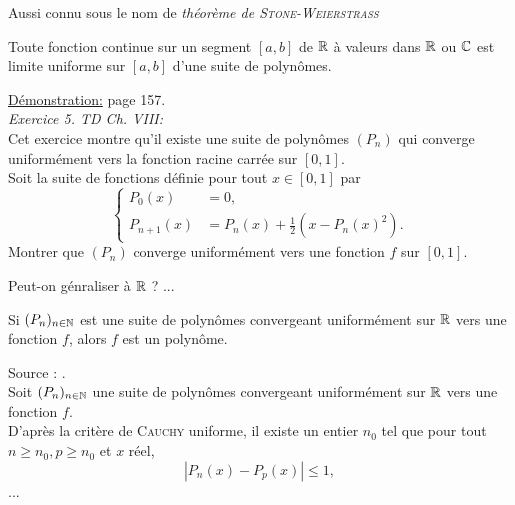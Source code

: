 Aussi connu sous le nom  de \emph{théorème de \textsc{Stone-Weierstrass}}

\begin{tcolorbox}
    Toute fonction continue sur un segment $[a, b]$ de $\mathbb{R}$ à valeurs dans $\mathbb{R}$ ou $\mathbb{C}$ est limite uniforme sur $[a, b]$ d'une suite de polynômes.
\end{tcolorbox}

\underline{Démonstration:} \cite{calcul_infinitesimal} page 157. \\
\emph{Exercice 5. TD Ch. VIII:}\\
Cet exercice montre qu'il existe une suite de polynômes $(P_n)$ qui converge uniformément vers la fonction racine carrée sur $[0, 1]$.\\
Soit la suite de fonctions définie pour tout $x \in [0, 1]$ par
$$
\begin{cases}
    P_0(x) &= 0,\\
    P_{n+1}(x) &= P_n (x) + \frac{1}{2}\left(x-P_n (x)^2 \right).
\end{cases}
$$
Montrer que $(P_n)$ converge uniformément vers une fonction $f$ sur $[0, 1]$.

\begin{marginfigure}[-5cm]
	
\end{marginfigure}

Peut-on génraliser à $\mathbb{R}$ ? ...

\begin{tcolorbox}
    Si $(P_n)_{n \in \mathbb{N}}$ est une suite de polynômes convergeant uniformément sur $\mathbb{R}$ vers une fonction $f$, alors $f$ est un polynôme.
\end{tcolorbox}

\begin{preuve}
    Source : \cite{maths-france}. \\
    Soit $(P_n)_{n \in \mathbb{N}}$ une suite de polynômes convergeant uniformément sur $\mathbb{R}$ vers une fonction $f$. \\
    D'après la critère de \textsc{Cauchy} uniforme, il existe un entier $n_0$ tel que pour tout $n \geqslant n_0, p\geqslant n_0$ et $x$ réel,
    $$|P_n(x) - P_p(x)| \leqslant 1,$$
    ...
\end{preuve}